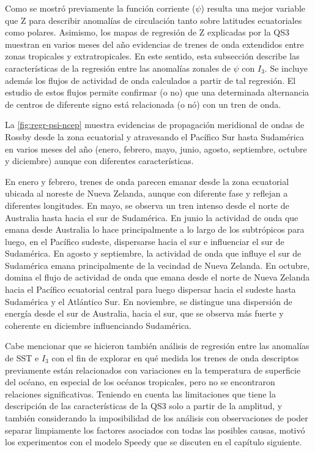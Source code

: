 \documentclass[spanish,a4paper,12pt,oneside]{book}
\begin{document}
Como se mostró previamente la función corriente (\(\psi\)) resulta una
mejor variable que Z para describir anomalías de circulación tanto sobre
latitudes ecuatoriales como polares. Asimismo, los mapas de regresión de
Z explicadas por la QS3 muestran en varios meses del año evidencias de
trenes de onda extendidos entre zonas tropicales y extratropicales. En
este sentido, esta subsección describe las características de la
regresión entre las anomalías zonales de \(\psi\) con \(I_3\). Se
incluye además los flujos de actividad de onda calculados a partir de
tal regresión. El estudio de estos flujos permite confirmar (o no) que
una determinada alternancia de centros de diferente signo está
relacionada (o nó) con un tren de onda.

La \autoref{fig:regr-psi-ncep} muestra evidencias de propagación
meridional de ondas de Rossby desde la zona ecuatorial y atravesando el
Pacífico Sur hasta Sudamérica en varios meses del año (enero, febrero,
mayo, junio, agosto, septiembre, octubre y diciembre) aunque con
diferentes características.

En enero y febrero, trenes de onda parecen emanar desde la zona
ecuatorial ubicada al noreste de Nueva Zelanda, aunque con diferente
fase y reflejan a diferentes longitudes. En mayo, se observa un tren
intenso desde el norte de Australia hasta hacia el sur de Sudamérica. En
junio la actividad de onda que emana desde Australia lo hace
principalmente a lo largo de los subtrópicos para luego, en el Pacífico
sudeste, dispersarse hacia el sur e influenciar el sur de Sudamérica. En
agosto y septiembre, la actividad de onda que influye el sur de
Sudamérica emana principalmente de la vecindad de Nueva Zelanda. En
octubre, domina el flujo de actividad de onda que emana desde el norte
de Nueva Zelanda hacia el Pacífico ecuatorial central para luego
dispersar hacia el sudeste hasta Sudamérica y el Atlántico Sur. En
noviembre, se distingue una dispersión de energía desde el sur de
Australia, hacia el sur, que se observa más fuerte y coherente en
diciembre influenciando Sudamérica.

Cabe mencionar que se hicieron también análisis de regresión entre las
anomalías de SST e \(I_3\) con el fin de explorar en qué medida los
trenes de onda descriptos previamente están relacionados con variaciones
en la temperatura de superficie del océano, en especial de los océanos
tropicales, pero no se encontraron relaciones significativas. Teniendo
en cuenta las limitaciones que tiene la descripción de las
características de la QS3 solo a partir de la amplitud, y también
considerando la imposibilidad de los análisis con observaciones de poder
separar limpiamente los factores asociados con todas las posibles
causas, motivó los experimentos con el modelo Speedy que se discuten en
el capítulo siguiente.
\end{document}
